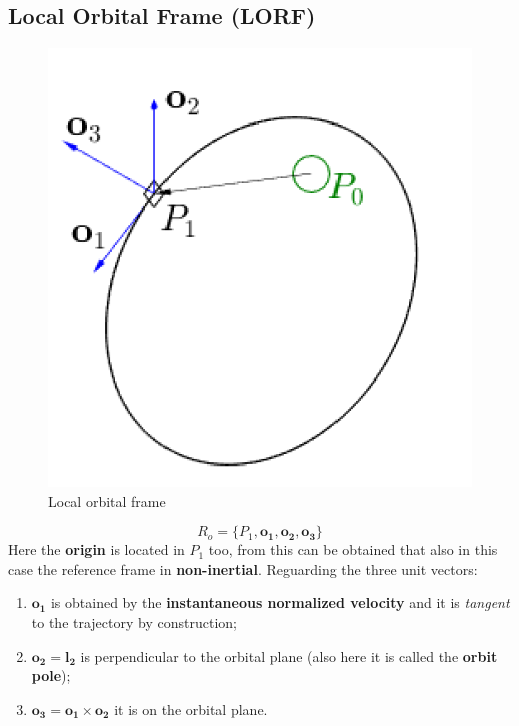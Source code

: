 \subsection{\textsf{\textbf{Local Orbital Frame (LORF)}}}
\vspace{-0.5em}
\begin{figure}[h]
    \centering
    \includegraphics[scale=0.5]{AerospaceApplications/images/LORF.png}
    \caption{Local orbital frame}
\end{figure}
{\Large\color{blue}
\begin{equation}
    R_o = \{
        P_1, \mathbf{o_1, o_2, o_3}
    \}
\end{equation}
}
Here the \textbf{origin} is located in $P_1$ too, from this can be obtained that also in this case the reference frame in \textbf{non-inertial}. Reguarding the three unit vectors: 
\begin{enumerate}
    \itemsep0em
    \item $\mathbf{o_1}$ is obtained by the \textbf{instantaneous normalized velocity} and it is \textit{tangent} to the trajectory by construction; 
    \item $\mathbf{o_2}=\mathbf{l_2}$ is perpendicular to the orbital plane (also here it is called the \textbf{orbit pole}); 
    \item $\mathbf{o_3} =\mathbf{o_1} \times \mathbf{o_2}$ it is on the orbital plane. 
\end{enumerate}

